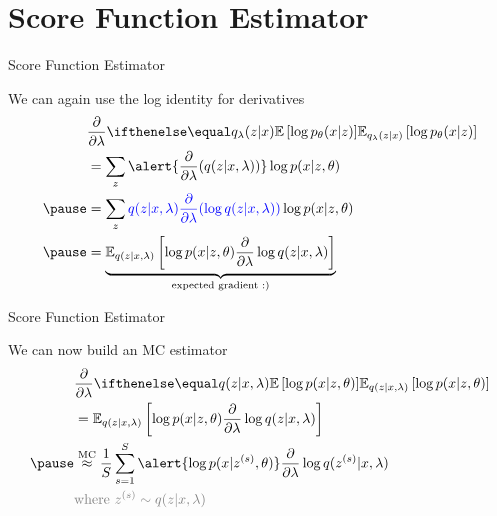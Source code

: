 \section{Score Function Estimator}

\begin{frame}{Score Function Estimator}

We can again use the log identity for derivatives
\vspace{-5pt}
\begin{equation*}
\begin{aligned}
&\pdv{\lambda}\E[q_\lambda(z|x)]{\log p_\theta(x|z)} \\ 
&=  \sum_z \alert{\pdv{\lambda}(q(z|x, \lambda))} \log p(x|z, \theta) \\  \pause
&= \sum_z \textcolor{blue}{q(z|x, \lambda) \pdv{\lambda}(\log q(z|x, \lambda))} \log p(x|z, \theta)  \\ \pause
&= \underbrace{\mathbb E_{q(z|x, \lambda)} \left[  \log p(x|z, \theta)  \pdv{\lambda}\log q(z|x, \lambda)\right]}_{\text{expected gradient :)}}
\end{aligned}
\end{equation*}


\end{frame}

\begin{frame}{Score Function Estimator}

We can now build an MC estimator
\begin{equation*}
\begin{aligned}
&\pdv{\lambda}\E[q(z|x,\lambda)]{\log p(x|z,\theta)} \\ 
&= \mathbb E_{q(z|x,\lambda)} \left[  \log p(x|z,\theta)  \pdv{\lambda}\log q(z|x,\lambda)\right] \\ \pause 
&\overset{\text{MC}}{\approx} \frac{1}{S} \sum_{s=1}^S \alert{\log p(x|z^{(s)}, \theta)} \pdv{\lambda}\log q(z^{(s)}|x, \lambda) \\
&\textcolor{gray}{\text{where } z^{(s)} \sim q(z|x, \lambda)}
\end{aligned}
\end{equation*}
\end{frame}


